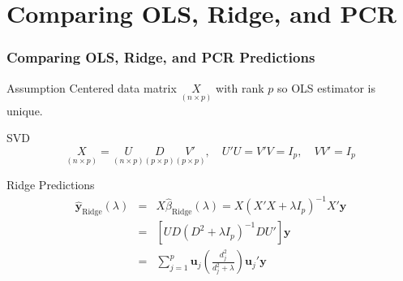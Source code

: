 \section{Comparing OLS, Ridge, and PCR}
\begin{frame}
  \frametitle{Comparing OLS, Ridge, and PCR Predictions}

  \begin{block}{Assumption}
    Centered data matrix $\underset{(n\times p)}{X}$ with rank $p$ so OLS estimator is unique.
  \end{block}

  \begin{block}{SVD}
    \vspace{-1em}
    \[
      \underset{(n\times p)}{X} = \underset{(n\times p)}{U} \underset{(p\times p)}{D} \underset{(p \times p)}{V'}, \quad U'U = V'V = I_p, \quad VV' = I_p
    \]
  \end{block}

\begin{block}{Ridge Predictions}
  \vspace{-1em}
  \begin{eqnarray*}
    \widehat{\mathbf{y}}_{\text{Ridge}}(\lambda) &=&  X\widehat{\beta}_{\text{Ridge}}(\lambda) = X\left( X'X + \lambda I_p \right)^{-1}X'\mathbf{y} \\
    &=& \left[ UD\left( D^2 + \lambda I_p \right)^{-1}DU' \right]\mathbf{y} \\
  &=& 
  \sum_{j=1}^p   \mathbf{u}_j\left( \frac{d_j^2}{d_j^2 + \lambda} \right)\mathbf{u}_j'\mathbf{y}
  \end{eqnarray*}
\end{block}


\end{frame}
